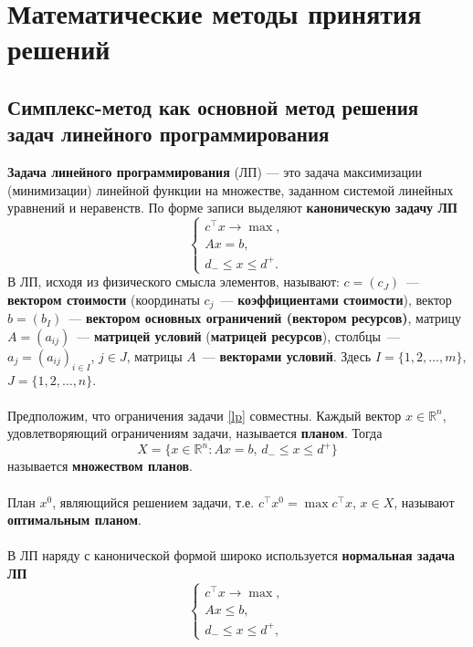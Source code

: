 \documentclass[a4paper, 12pt]{report}
\numberwithin{equation}{section}
\renewcommand{\leq}{\leqslant}
\begin{document}
	\chapter{Математические методы принятия решений}

    \section{Симплекс-метод как основной метод решения задач линейного программирования}
    \textbf{Задача линейного программирования} (ЛП) --- это задача максимизации (минимизации) линейной функции на множестве, заданном системой линейных уравнений и неравенств. По форме записи выделяют \textbf{каноническую задачу ЛП}
    \begin{equation}
    \label{lp}
    \begin{cases}
        c^\top x \to \max, \\ Ax = b, \\ d_{-} \leq x \leq d^{+}.
    \end{cases}
    \end{equation}
    В ЛП, исходя из физического смысла элементов, называют: $c = (c_J)$~--- \textbf{вектором стоимости} (координаты $c_j$~--- \textbf{коэффициентами стоимости}), вектор $b = (b_I)$~--- \textbf{вектором основных ограничений (вектором ресурсов)}, матрицу $A = (a_{ij})$~--- \textbf{матрицей условий} (\textbf{матрицей ресурсов}), столбцы~--- $a_j = (a_{ij})_{i \in I}$, $j \in J$, матрицы $A$~--- \textbf{векторами условий}. Здесь $I = \{1, 2, \ldots, m\}$, $J = \{1, 2, \ldots, n\}$.
\\\\
Предположим, что ограничения задачи \eqref{lp} совместны. Каждый вектор $x \in \mathbb{R}^n$, удовлетворяющий ограничениям задачи, называется \textbf{планом}. Тогда
\[
    X = \{x \in \mathbb{R}^n : Ax = b, \, d_{-} \leq x \leq d^{+}\}
\]
называется \textbf{множеством планов}.
\\\\
План $x^0$, являющийся решением задачи, т.е. $c^\top x^0 = \max c^\top x$, $x \in X$, называют \textbf{оптимальным планом}.
\\\\
В ЛП наряду с канонической формой широко используется \textbf{нормальная задача ЛП}
\begin{equation}
\label{lp-2}
\begin{cases}
    c^\top x \to \max, \\ Ax \leq b, \\ d_{-} \leq x \leq d^{+},
\end{cases}
\end{equation}
\end{document}
